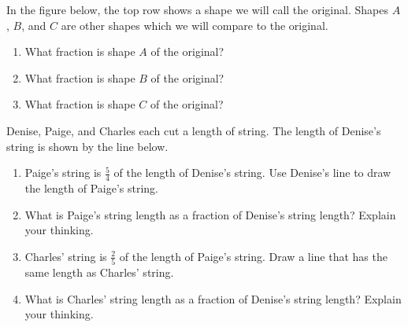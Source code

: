 \documentclass{ximera}
\begin{document}
\begin{problem} In the figure below, the top row shows a shape we will call the original.  Shapes $A$, $B$, and $C$ are other shapes which we will compare to the original. 
\begin{enumerate}
\item What fraction is shape $A$ of the original?
\item  What fraction is shape $B$ of the original?
\item What fraction is shape $C$ of the original?
\end{enumerate}

\begin{image}
\end{image}


\end{problem}

\begin{problem}

Denise, Paige, and Charles each cut a length of string. The length of Denise's string is shown by the line below. 
\begin{image} \end{image}
\vskip 1in
\begin{enumerate}
	\item Paige's string is $\frac{5}{4}$ of the length of Denise's string. Use Denise's line to draw the length of Paige's string.
	\item What is Paige's string length as a fraction of Denise's string length? Explain your thinking.
	\item Charles' string is $\frac{2}{5}$ of the length of Paige's string. Draw a line that has the same length as Charles' string.
	\item What is Charles' string length as a fraction of Denise's string length? Explain your thinking.
\end{enumerate}
\end{problem}
\end{document}
